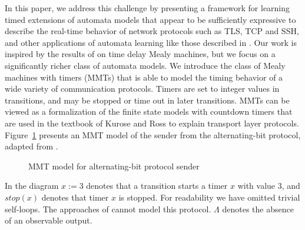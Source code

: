 In this paper, we address this challenge by presenting a framework for learning
timed extensions of automata models that appear to
be sufficiently expressive to describe the real-time behavior of network protocols such as TLS, TCP and SSH, and other
applications of automata learning like those described in \cite{Vaa17}.
%
Our work is inspired by the results of \cite{CCF16} on time delay Mealy machines,
but we focus on a significantly richer class of automata models.
We introduce the class of Mealy machines with timers (MMTs) that is able to
model the timing behavior of a wide variety of communication protocols.
Timers are set to integer values in transitions, and may be stopped or
time out in later transitions.
MMTs can be viewed as a formalization of the finite state models with countdown timers that are used in the textbook of
Kurose and Ross \cite{KR13} to explain transport layer protocols.
Figure~\ref{fig:abp} presents an MMT model of the sender from 
the alternating-bit protocol, adapted from \cite[Figure 3.15]{KR13}.
\begin{figure}[h]
\centering
\ifshort
\vspace{-2 em}
\fi
{}
\caption{MMT model for alternating-bit protocol sender}
\label{fig:abp}
\end{figure}
In the diagram $x :=3$ denotes that a transition starts a timer $x$ with value $3$,
and $\mathit{stop}(x)$ denotes that timer $x$ is stopped.
For readability we have omitted trivial self-loops.
The approaches of \cite{VWW:rti,CCF16} cannot model this protocol.
\iflong
$\Lambda$ denotes the absence of an observable output. 

